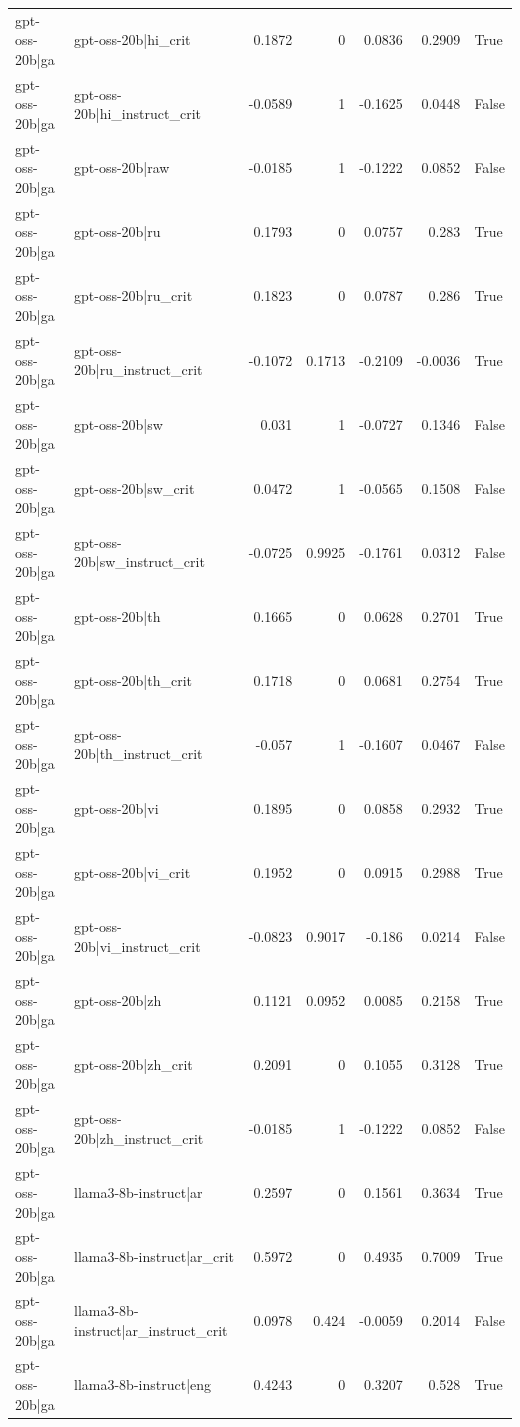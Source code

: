 \begin{table}
\begin{tabular}{l l r r r r l}
gpt-oss-20b|ga & gpt-oss-20b|hi_crit & 0.1872 & 0 & 0.0836 & 0.2909 & True \\
gpt-oss-20b|ga & gpt-oss-20b|hi_instruct_crit & -0.0589 & 1 & -0.1625 & 0.0448 & False \\
gpt-oss-20b|ga & gpt-oss-20b|raw & -0.0185 & 1 & -0.1222 & 0.0852 & False \\
gpt-oss-20b|ga & gpt-oss-20b|ru & 0.1793 & 0 & 0.0757 & 0.283 & True \\
gpt-oss-20b|ga & gpt-oss-20b|ru_crit & 0.1823 & 0 & 0.0787 & 0.286 & True \\
gpt-oss-20b|ga & gpt-oss-20b|ru_instruct_crit & -0.1072 & 0.1713 & -0.2109 & -0.0036 & True \\
gpt-oss-20b|ga & gpt-oss-20b|sw & 0.031 & 1 & -0.0727 & 0.1346 & False \\
gpt-oss-20b|ga & gpt-oss-20b|sw_crit & 0.0472 & 1 & -0.0565 & 0.1508 & False \\
gpt-oss-20b|ga & gpt-oss-20b|sw_instruct_crit & -0.0725 & 0.9925 & -0.1761 & 0.0312 & False \\
gpt-oss-20b|ga & gpt-oss-20b|th & 0.1665 & 0 & 0.0628 & 0.2701 & True \\
gpt-oss-20b|ga & gpt-oss-20b|th_crit & 0.1718 & 0 & 0.0681 & 0.2754 & True \\
gpt-oss-20b|ga & gpt-oss-20b|th_instruct_crit & -0.057 & 1 & -0.1607 & 0.0467 & False \\
gpt-oss-20b|ga & gpt-oss-20b|vi & 0.1895 & 0 & 0.0858 & 0.2932 & True \\
gpt-oss-20b|ga & gpt-oss-20b|vi_crit & 0.1952 & 0 & 0.0915 & 0.2988 & True \\
gpt-oss-20b|ga & gpt-oss-20b|vi_instruct_crit & -0.0823 & 0.9017 & -0.186 & 0.0214 & False \\
gpt-oss-20b|ga & gpt-oss-20b|zh & 0.1121 & 0.0952 & 0.0085 & 0.2158 & True \\
gpt-oss-20b|ga & gpt-oss-20b|zh_crit & 0.2091 & 0 & 0.1055 & 0.3128 & True \\
gpt-oss-20b|ga & gpt-oss-20b|zh_instruct_crit & -0.0185 & 1 & -0.1222 & 0.0852 & False \\
gpt-oss-20b|ga & llama3-8b-instruct|ar & 0.2597 & 0 & 0.1561 & 0.3634 & True \\
gpt-oss-20b|ga & llama3-8b-instruct|ar_crit & 0.5972 & 0 & 0.4935 & 0.7009 & True \\
gpt-oss-20b|ga & llama3-8b-instruct|ar_instruct_crit & 0.0978 & 0.424 & -0.0059 & 0.2014 & False \\
gpt-oss-20b|ga & llama3-8b-instruct|eng & 0.4243 & 0 & 0.3207 & 0.528 & True \\

\end{tabular}
\end{table}
